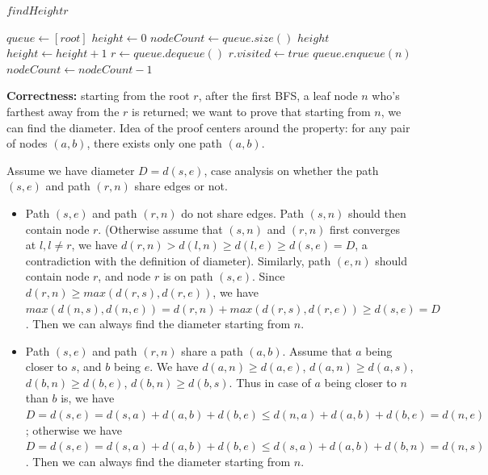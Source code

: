 \documentclass{article}
\begin{document}
\begin{description}
\begin{algorithm}[h]
\begin{algorithmic}[1]
      \Return \State $findHeight{r}$
    \EndFunction

      \State $queue \gets [root]$
      \State $height \gets 0$
        \State $nodeCount \gets queue.size()$
          \State \Return $height$
        \EndIf
        \State $height \gets height + 1$
          \State $r \gets queue.dequeue()$
          \State $r.visited \gets true$
            \State $queue.enqueue(n)$
          \EndFor
          \State $nodeCount \gets nodeCount - 1$
        \EndWhile
      \EndWhile
    \EndFunction

    \end{algorithmic}
  \end{algorithm}
  

  \textbf{Correctness:} starting from the root $r$, after the first BFS, a leaf node $n$ who's farthest away from the $r$ is returned; we want to prove that starting from $n$, we can find the diameter. Idea of the proof centers around the property: for any pair of nodes $(a,b)$, there exists only one path $(a,b)$.

  Assume we have diameter $D = d(s,e)$, case analysis on whether the path $(s,e)$ and path $(r,n)$ share edges or not.

  \begin{itemize}
    \item
    Path $(s,e)$ and path $(r,n)$ do not share edges. Path $(s,n)$ should then contain node $r$. (Otherwise assume that $(s, n)$ and $(r, n)$ first converges at $l, l \neq r$, we have $d(r, n) > d(l, n) \geq d(l,e) \geq d(s,e) = D$, a contradiction with the definition of diameter). Similarly, path $(e,n)$ should contain node $r$, and node $r$ is on path $(s,e)$. Since $d(r,n) \geq max(d(r,s), d(r,e))$, we have $max(d(n,s),d(n,e)) = d(r,n) + max(d(r,s), d(r,e)) \geq d(s,e) = D$. Then we can always find the diameter starting from $n$.

    \item
    Path $(s,e)$ and path $(r,n)$ share a path $(a,b)$. Assume that $a$ being closer to $s$, and $b$ being $e$. We have $d(a,n) \geq d(a,e)$, $d(a,n) \geq d(a,s)$, $d(b,n) \geq d(b,e)$, $d(b,n) \geq d(b,s)$. Thus in case of $a$ being closer to $n$ than $b$ is, we have $D = d(s,e) = d(s,a) + d(a,b) + d(b,e) \leq d(n,a) + d(a,b) + d(b,e) = d(n,e)$; otherwise we have $D = d(s,e) = d(s,a) + d(a,b) + d(b,e) \leq d(s,a) + d(a,b) + d(b,n) = d(n,s)$. Then we can always find the diameter starting from $n$.
  \end{itemize}


\end{description}
\end{document}
